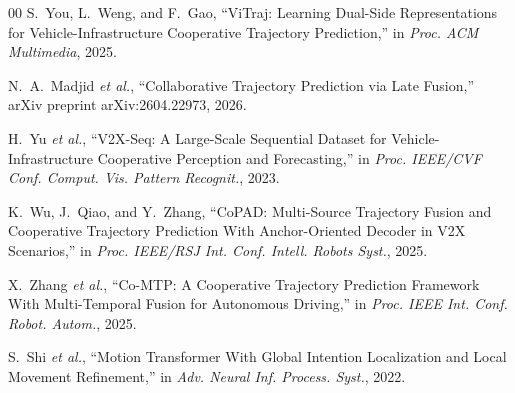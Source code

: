 \documentclass[lettersize,journal]{IEEEtran}
\begin{document}
\begin{thebibliography}{00}
S.~You, L.~Weng, and F.~Gao, ``ViTraj: Learning Dual-Side Representations for Vehicle-Infrastructure Cooperative Trajectory Prediction,'' in \emph{Proc. ACM Multimedia}, 2025.

N.~A.~Madjid \emph{et al.}, ``Collaborative Trajectory Prediction via Late Fusion,'' arXiv preprint arXiv:2604.22973, 2026.

H.~Yu \emph{et al.}, ``V2X-Seq: A Large-Scale Sequential Dataset for Vehicle-Infrastructure Cooperative Perception and Forecasting,'' in \emph{Proc. IEEE/CVF Conf. Comput. Vis. Pattern Recognit.}, 2023.

K.~Wu, J.~Qiao, and Y.~Zhang, ``CoPAD: Multi-Source Trajectory Fusion and Cooperative Trajectory Prediction With Anchor-Oriented Decoder in V2X Scenarios,'' in \emph{Proc. IEEE/RSJ Int. Conf. Intell. Robots Syst.}, 2025.

X.~Zhang \emph{et al.}, ``Co-MTP: A Cooperative Trajectory Prediction Framework With Multi-Temporal Fusion for Autonomous Driving,'' in \emph{Proc. IEEE Int. Conf. Robot. Autom.}, 2025.

S.~Shi \emph{et al.}, ``Motion Transformer With Global Intention Localization and Local Movement Refinement,'' in \emph{Adv. Neural Inf. Process. Syst.}, 2022.
\end{thebibliography}
\end{document}
